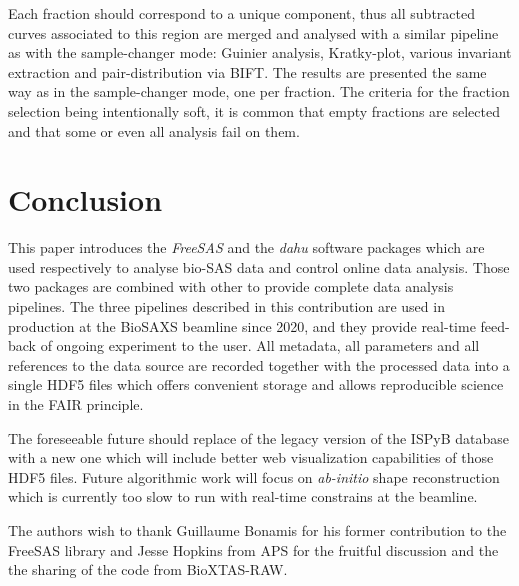 \documentclass[preprint]{iucr}              %
\begin{document}
Each fraction should correspond to a unique component, thus all subtracted curves associated to this region are merged and analysed with a similar pipeline as with the sample-changer mode: Guinier analysis, Kratky-plot, various invariant extraction and pair-distribution via BIFT. 
The results are presented the same way as in the sample-changer mode, one per fraction.
The criteria for the fraction selection being intentionally soft, it is common that empty fractions are selected and that some or even all analysis fail on them. 


\section{Conclusion}

This paper introduces the \textit{FreeSAS} and the \textit{dahu} software packages which are used respectively to analyse bio-SAS data and control online data analysis. 
Those two packages are combined with other to provide complete data analysis pipelines.
The three pipelines described in this contribution are used in production at the BioSAXS beamline 
since 2020, and they provide real-time feed-back of ongoing experiment to the user.
All metadata, all parameters and all references to the data source are recorded together with the processed data into
a single HDF5 files which offers convenient storage and allows reproducible science in the FAIR principle. 

The foreseeable future should replace of the legacy version of the ISPyB database with a new one which will include better web visualization capabilities of those HDF5 files.
Future algorithmic work will focus on \textit{ab-initio} shape reconstruction which is currently too slow to run with real-time constrains at the beamline.


The authors wish to thank Guillaume Bonamis for his former contribution to the FreeSAS library and Jesse Hopkins from APS for the fruitful discussion and the the sharing of the code from BioXTAS-RAW.





\end{document}
